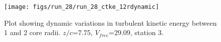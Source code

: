 \begin{figure}[H]
\centering
\texttt{[image: figs/run\_28/run\_28\_ctke\_12rdynamic]}
\caption{Plot showing dynamic variations in turbulent kinetic energy between 1 and 2 core radii. $z/c$=7.75, $V_{free}$=29.09, station 3.}
\label{fig:run_28_ctke_12rdynamic}
\end{figure}


